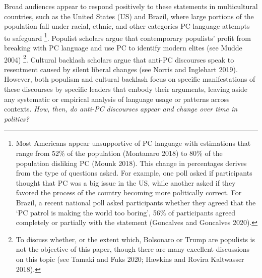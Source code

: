 \documentclass[smallextended]{svjour3}       %
\begin{document}
Broad audiences appear to respond positively to these statements in
multicultural countries, such as the United States (US) and Brazil,
where large portions of the population fall under racial, ethnic, and
other categories PC language attempts to safeguard \footnote{ Most
  Americans appear unsupportive of PC language with estimations that
  range from 52\% of the population (Montanaro 2018) to 80\% of the
  population disliking PC (Mounk 2018). This change in percentages
  derives from the type of questions asked. For example, one poll asked
  if participants thought that PC was a big issue in the US, while
  another asked if they favored the process of the country becoming more
  politically correct. For Brazil, a recent national poll asked
  participants whether they agreed that the `PC patrol is making the
  world too boring', 56\% of participants agreed completely or partially
  with the statement (Goncalves and Goncalves 2020).}. Populist scholars
argue that contemporary populists' profit from breaking with PC language
and use PC to identify modern elites (see Mudde 2004) \footnote{ To
  discuss whether, or the extent which, Bolsonaro or Trump are populists
  is not the objective of this paper, though there are many excellent
  discussions on this topic (see Tamaki and Fuks 2020; Hawkins and
  Rovira Kaltwasser 2018).}. Cultural backlash scholars argue that
anti-PC discourses speak to resentment caused by silent liberal changes
(see Norris and Inglehart 2019). However, both populism and cultural
backlash focus on specific manifestations of these discourses by
specific leaders that embody their arguments, leaving aside any
systematic or empirical analysis of language usage or patterns across
contexts. \emph{How, then, do anti-PC discourses appear and change over
time in politics?}
\end{document}
